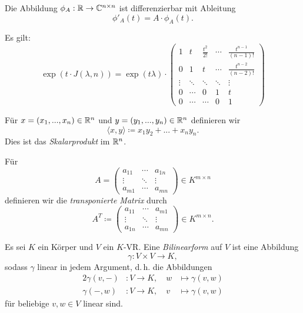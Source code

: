 \documentclass{cheat-sheet}
\begin{document}

\begin{satz}
Die Abbildung $\phi_A : \mathbb{R} \to \mathbb{C}^{n \times n}$ ist differenzierbar mit Ableitung
\[ \phi'_A(t) = A \cdot \phi_A(t). \]
\end{satz}


\begin{satz}
Es gilt:
\[ \exp(t \cdot J(\lambda, n)) = \exp(t \lambda) \cdot \begin{pmatrix}
1 & t & \tfrac{t^2}{2!} & \cdots & \tfrac{t^{n-1}}{(n-1)!} \\
0 & 1 & t & \cdots & \tfrac{t^{n-2}}{(n-2)!} \\
\vdots & \ddots & \ddots & \ddots & \vdots \\
0 & \cdots & 0 & 1 & t \\
0 & \cdots & \cdots & 0 & 1
\end{pmatrix} \]
\end{satz}


\begin{definition}
Für $x = (x_1, ..., x_n) \in \mathbb{R}^n$ und $y = (y_1, ..., y_n) \in \mathbb{R}^n$ definieren wir
\[ \langle x , y \rangle \coloneqq x_1y_2 + ... + x_ny_n. \]
Dies ist das \emph{Skalarprodukt} im $\mathbb{R}^n$.
\end{definition}

\begin{definition}
Für
\[ A = \begin{pmatrix}
a_{11} & \cdots & a_{1n} \\
\vdots & \ddots & \vdots \\
a_{m1} & \cdots & a_{mn}
\end{pmatrix} \in K^{m \times n} \]
definieren wir die \emph{transponierte Matrix} durch
\[ A^{T} \coloneqq \begin{pmatrix}
a_{11} & \cdots & a_{m1} \\
\vdots & \ddots & \vdots \\
a_{1n} & \cdots & a_{mn}
\end{pmatrix} \in K^{m \times n}. \]
\end{definition}

\begin{definition}
Es sei $K$ ein Körper und $V$ ein $K$-VR. Eine \emph{Bilinearform} auf $V$ ist eine Abbildung
\[ \gamma : V \times V \to K, \]
sodass $\gamma$ linear in jedem Argument, d.\,h. die Abbildungen
\begin{alignat*}{2}
\gamma(v, -) &: V \to K, \quad w & \mapsto \gamma(v, w) \\
\gamma(-, w) &: V \to K, \quad v & \mapsto \gamma(v, w)
\end{alignat*}
für beliebige $v, w \in V$ linear sind.
\end{definition}
\end{document}
